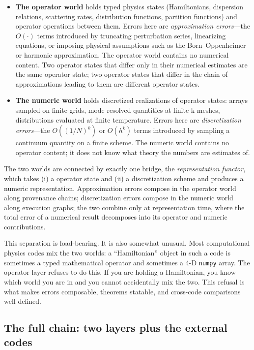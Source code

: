\documentclass[11pt,a4paper]{article}
\newcommand{\abstr}[1]{\textcolor{abstrcol}{#1}}
\newcommand{\numr}[1]{\textcolor{numcol}{#1}}
\begin{document}
\begin{itemize}[leftmargin=2em]
  \item \abstr{\textbf{The operator world}} holds typed physics states (Hamiltonians, dispersion
        relations, scattering rates, distribution functions, partition functions) and operator
        operations between them. Errors here are \emph{approximation errors}---the $O(\cdot)$
        terms introduced by truncating perturbation series, linearizing equations, or imposing
        physical assumptions such as the Born--Oppenheimer or harmonic approximation. The
        operator world contains no numerical content. Two operator states that differ only in
        their numerical estimates are the same operator state; two operator states that differ
        in the chain of approximations leading to them are different operator states.
  \item \numr{\textbf{The numeric world}} holds discretized realizations of operator states:
        arrays sampled on finite grids, mode-resolved quantities at finite k-meshes,
        distributions evaluated at finite temperature. Errors here are \emph{discretization
        errors}---the $O((1/N)^k)$ or $O(h^k)$ terms introduced by sampling a continuum quantity
        on a finite scheme. The numeric world contains no operator content; it does not know
        what theory the numbers are estimates of.
\end{itemize}

The two worlds are connected by exactly one bridge, the \emph{representation functor}, which
takes (i) a operator state and (ii) a discretization scheme and produces a numeric
representation. Approximation errors compose in the operator world along provenance chains;
discretization errors compose in the numeric world along execution graphs; the two combine only
at representation time, where the total error of a numerical result decomposes into its operator
and numeric contributions.

This separation is load-bearing. It is also somewhat unusual. Most computational physics codes
mix the two worlds: a ``Hamiltonian'' object in such a code is sometimes a typed mathematical
operator and sometimes a 4-D \texttt{numpy} array. The operator layer refuses to do this. If you are
holding a Hamiltonian, you know which world you are in and you cannot
accidentally mix the two. This refusal is what makes errors composable, theorems statable, and
cross-code comparisons well-defined.

\subsection{The full chain: two layers plus the external codes}
\label{ssec:two-layer-chain}
\end{document}
